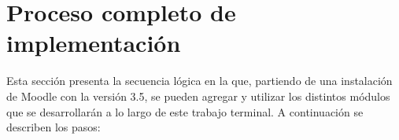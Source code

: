 
\section{Proceso completo de implementación}
\label{analisis:visionyuso}

 Esta sección presenta la secuencia lógica en la que, partiendo de una instalación
 de Moodle con la versión 3.5, se pueden agregar y utilizar los distintos módulos
 que se desarrollarán a lo largo de este trabajo terminal. A continuación se
 describen los pasos:

\newcommand{\Recomendacion}[2][Recomendación:]{%
}

